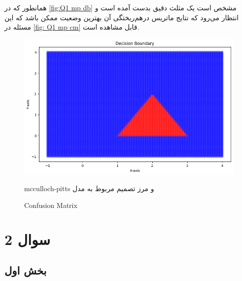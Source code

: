 \documentclass{article}
\begin{document}
همانطور که در ‎\autoref{fig:Q1 mp db}‎ مشخص است یک مثلث دقیق بدست آمده است و انتظار می‌رود که نتایج ماتریس درهم‌ریختگی آن بهترین وضعیت ممکن باشد که این مسئله در ‎\autoref{fig: Q1 mp cm}‎ قابل مشاهده است.

\begin{figure}[H] 
	\centering
		\includegraphics[width=0.4\linewidth]{img/Q1_cp_db.png}
		\label{fig:Q1 mp db}
\caption{mcculloch-pitts و مرز تصمیم مربوط به مدل}
\end{figure}


\begin{figure}[H] 
	\centering
	\caption{Confusion Matrix}
	\label{fig: Q1 mp cm}
\end{figure}


\section{سوال 2}

\subsection{بخش اول}
\end{document}

